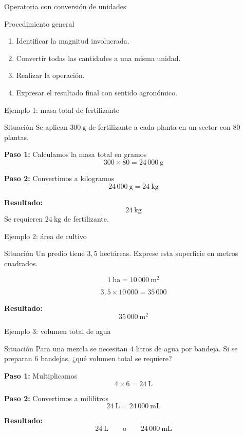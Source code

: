 \documentclass[handout,aspectratio=169,10pt]{beamer}
\begin{document}
	\begin{frame}{Operatoria con conversión de unidades}
		\begin{block}{Procedimiento general}
			\begin{enumerate}[<+->]
				\item Identificar la magnitud involucrada.
				\item Convertir todas las cantidades a una misma unidad.
				\item Realizar la operación.
				\item Expresar el resultado final con sentido agronómico.
			\end{enumerate}
		\end{block}
	\end{frame}
	
	\begin{frame}{Ejemplo 1: masa total de fertilizante}
		\begin{block}{Situación}
			Se aplican \(300\ \text{g}\) de fertilizante a cada planta en un sector con \(80\) plantas.
		\end{block}
		
		\pause
		\textbf{Paso 1:} Calculamos la masa total en gramos
		\[
		300 \times 80 = 24\,000\ \text{g}
		\]
		
		\pause
		\textbf{Paso 2:} Convertimos a kilogramos
		\[
		24\,000\ \text{g} = 24\ \text{kg}
		\]
		
		\pause
		\textbf{Resultado:}
		\[
		\boxed{24\ \text{kg}}
		\]
		Se requieren \(24\ \text{kg}\) de fertilizante.
	\end{frame}
	
	\begin{frame}{Ejemplo 2: área de cultivo}
		\begin{block}{Situación}
			Un predio tiene \(3{,}5\) hectáreas. Exprese esta superficie en metros cuadrados.
		\end{block}
		
		\pause
		\[
		1\ \text{ha} = 10\,000\ \text{m}^2
		\]
		
		\pause
		\[
		3{,}5 \times 10\,000 = 35\,000
		\]
		
		\pause
		\textbf{Resultado:}
		\[
		\boxed{35\,000\ \text{m}^2}
		\]
	\end{frame}
	
	\begin{frame}{Ejemplo 3: volumen total de agua}
		\begin{block}{Situación}
			Para una mezcla se necesitan \(4\) litros de agua por bandeja.  
			Si se preparan \(6\) bandejas, ¿qué volumen total se requiere?
		\end{block}
		
		\pause
		\textbf{Paso 1:} Multiplicamos
		\[
		4 \times 6 = 24\ \text{L}
		\]
		
		\pause
		\textbf{Paso 2:} Convertimos a mililitros
		\[
		24\ \text{L} = 24\,000\ \text{mL}
		\]
		
		\pause
		\textbf{Resultado:}
		\[
		\boxed{24\ \text{L}} \qquad \text{o} \qquad \boxed{24\,000\ \text{mL}}
		\]
	\end{frame}
	
\end{document}
